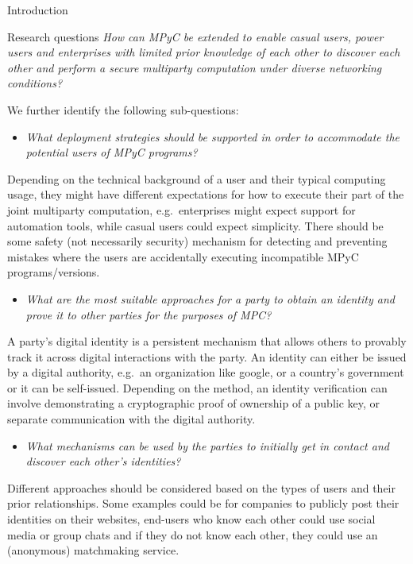 \begin{frame}{Introduction}
\begin{block}{Research questions}
\emph{How can MPyC be extended to enable casual users, power users and
enterprises with limited prior knowledge of each other to discover each
other and perform a secure multiparty computation under diverse
networking conditions?}

We further identify the following sub-questions:

\begin{itemize}
\tightlist
\item
  \emph{What deployment strategies should be supported in order to
  accommodate the potential users of MPyC programs?}
\end{itemize}

Depending on the technical background of a user and their typical
computing usage, they might have different expectations for how to
execute their part of the joint multiparty computation, e.g.~enterprises
might expect support for automation tools, while casual users could
expect simplicity. There should be some safety (not necessarily
security) mechanism for detecting and preventing mistakes where the
users are accidentally executing incompatible MPyC programs/versions.

\begin{itemize}
\tightlist
\item
  \emph{What are the most suitable approaches for a party to obtain an
  identity and prove it to other parties for the purposes of MPC?}
\end{itemize}

A party's digital identity is a persistent mechanism that allows others
to provably track it across digital interactions with the party. An
identity can either be issued by a digital authority, e.g.~an
organization like google, or a country's government or it can be
self-issued. Depending on the method, an identity verification can
involve demonstrating a cryptographic proof of ownership of a public
key, or separate communication with the digital authority.

\begin{itemize}
\tightlist
\item
  \emph{What mechanisms can be used by the parties to initially get in
  contact and discover each other's identities?}
\end{itemize}

Different approaches should be considered based on the types of users
and their prior relationships. Some examples could be for companies to
publicly post their identities on their websites, end-users who know
each other could use social media or group chats and if they do not know
each other, they could use an (anonymous) matchmaking service.


\end{block}
\end{frame}
